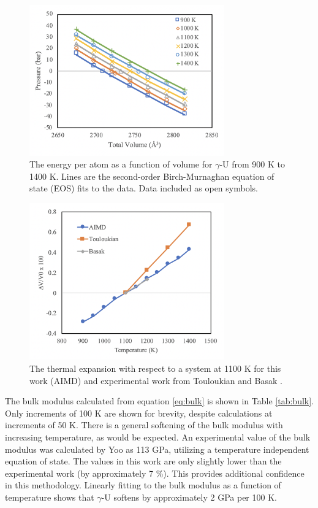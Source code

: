 \documentclass[review]{elsarticle}
\begin{document}
\begin{figure}[h]
 \centering
 \includegraphics[width=0.75\textwidth]{2_p_vs_v.png} 
 \caption{The energy per atom as a function of volume for $\gamma$-U from 900 K to 1400 K. Lines are the second-order Birch-Murnaghan equation of state (EOS) fits to the data. Data included as open symbols. }
 \label{fig:pvsv}
\end{figure}

\begin{figure}[h]
 \centering
 \includegraphics[width=0.75\textwidth]{3_thermal_exp.png} 
 \caption{The thermal expansion with respect to a system at 1100 K for this work (AIMD) and experimental work from Touloukian \cite{touloukian} and Basak \cite{basak} .   }
 \label{fig:exp}
\end{figure}

\FloatBarrier

The bulk modulus calculated from equation \ref{eq:bulk} is shown in Table \ref{tab:bulk}. Only increments of 100 K are shown for brevity, despite calculations at increments of 50 K. There is a general softening of the bulk modulus with increasing temperature, as would be expected. An experimental value of the bulk modulus was calculated by Yoo \cite{yoo1998} as 113 GPa, utilizing a temperature independent equation of state. The values in this work are only slightly lower than the experimental work (by approximately 7 {\%}). This provides additional confidence in this methodology. Linearly fitting to the bulk modulus as a function of temperature shows that $\gamma$-U softens by approximately 2 GPa per 100 K. 
\end{document}
